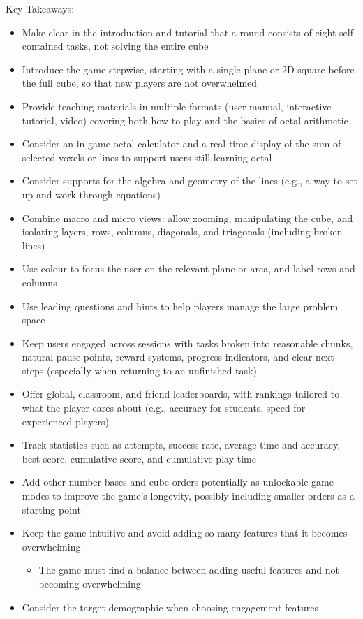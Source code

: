 \documentclass{article}
\begin{document}
Key Takeaways:

\begin{itemize}
  \item Make clear in the introduction and tutorial that a round consists of eight self-contained tasks, not solving the entire cube
  \item Introduce the game stepwise, starting with a single plane or 2D square before the full cube, so that new players are not overwhelmed
  \item Provide teaching materials in multiple formats (user manual, interactive tutorial, video) covering both how to play and the basics of octal arithmetic
  \item Consider an in-game octal calculator and a real-time display of the sum of selected voxels or lines to support users still learning octal
  \item Consider supports for the algebra and geometry of the lines (e.g., a way to set up and work through equations)
  \item Combine macro and micro views: allow zooming, manipulating the cube, and isolating layers, rows, columns, diagonals, and triagonals (including broken lines)
  \item Use colour to focus the user on the relevant plane or area, and label rows and columns
  \item Use leading questions and hints to help players manage the large problem space
  \item Keep users engaged across sessions with tasks broken into reasonable chunks, natural pause points, reward systems, progress indicators, and clear next steps (especially when returning to an unfinished task)
  \item Offer global, classroom, and friend leaderboards, with rankings tailored to what the player cares about (e.g., accuracy for students, speed for experienced players)
  \item Track statistics such as attempts, success rate, average time and accuracy, best score, cumulative score, and cumulative play time
  \item Add other number bases and cube orders potentially as unlockable game modes to improve the game's longevity, possibly including smaller orders as a starting point
  \item Keep the game intuitive and avoid adding so many features that it becomes overwhelming
  \begin{itemize}
    \item The game must find a balance between adding useful features and not becoming overwhelming
  \end{itemize}
  \item Consider the target demographic when choosing engagement features
\end{itemize}
\end{document}

